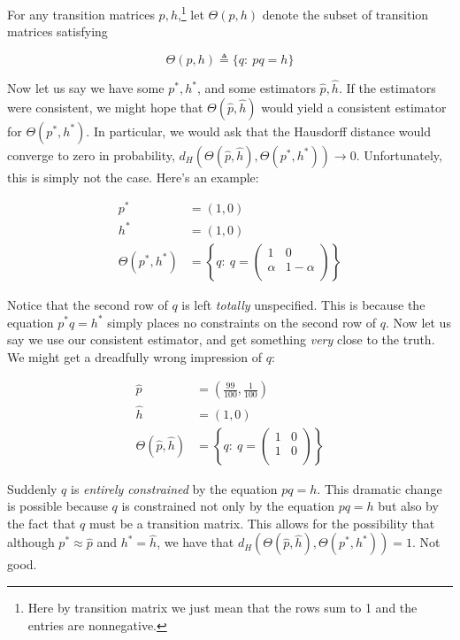 For any transition matrices $p,h$,\footnote{Here by transition matrix we just mean that the rows sum to 1 and the entries are nonnegative.} let $\Theta(p,h)$ denote the subset of transition matrices satisfying

\[
\Theta(p,h) \triangleq \{q:\ pq=h\}
\]

Now let us say we have some $p^*,h^*$, and some estimators $\hat p,\hat h$.  If the estimators were consistent, we might hope that $\Theta(\hat p,\hat h)$ would yield a consistent estimator for $\Theta(p^*,h^*)$.  In particular, we would ask that the Hausdorff distance would converge to zero in probability, $d_H(\Theta(\hat p,\hat h),\Theta(p^*,h^*))\rightarrow 0$.  Unfortunately, this is simply not the case.  Here's an example:

\begin{align*}
p^* &= (1, 0)\\
h^* &= (1, 0)\\
\Theta(p^*,h^*) &= 
  \left\{q:\ q=\left(\begin{array}{cc}
  1 & 0 \\
  \alpha & 1-\alpha \\
  \end{array}\right)\right\}
\end{align*}

Notice that the second row of $q$ is left \emph{totally} unspecified.  This is because the equation $p^*q=h^*$ simply places no constraints on the second row of $q$.  Now let us say we use our consistent estimator, and get something \emph{very} close to the truth.  We might get a dreadfully wrong impression of $q$:

\begin{align*}
\hat p &= \left(\frac{99}{100}, \frac{1}{100}\right)\\
\hat h &= (1, 0)\\
\Theta(\hat p,\hat h) &= 
  \left\{q:\ q=\left(\begin{array}{cc}
  1 & 0 \\
  1 & 0 \\
  \end{array}\right)\right\}
\end{align*}

Suddenly $q$ is \emph{entirely constrained} by the equation $pq=h$.  This dramatic change is possible because $q$ is constrained not only by the equation $pq=h$ but also by the fact that $q$ must be a transition matrix.  This allows for the possibility that although $p^*\approx \hat p$ and $h^*=\hat h$, we have that $d_H(\Theta(\hat p,\hat h),\Theta(p^*,h^*))=1$.  Not good.

